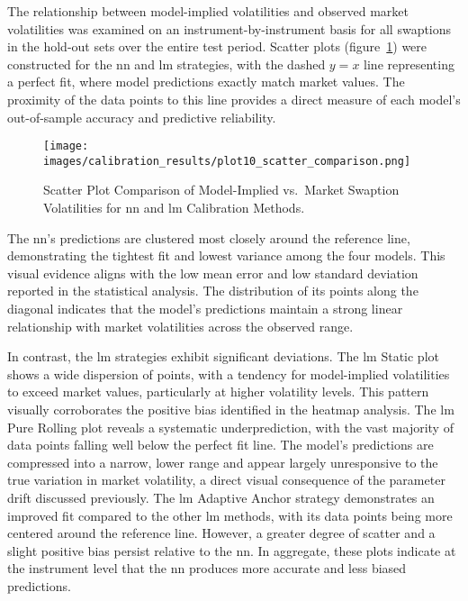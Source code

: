 The relationship between model-implied volatilities and observed market volatilities was examined on an instrument-by-instrument basis for all swaptions in the hold-out sets over the entire test period. Scatter plots (figure~\ref{fig:scatter_comparison}) were constructed for the \ac{nn} and \ac{lm} strategies, with the dashed \(y=x\) line representing a perfect fit, where model predictions exactly match market values. The proximity of the data points to this line provides a direct measure of each model's out-of-sample accuracy and predictive reliability.

\begin{figure}[H]
	\centering
	\texttt{[image: images/calibration\_results/plot10\_scatter\_comparison.png]}
	\caption{Scatter Plot Comparison of Model-Implied vs.\ Market Swaption Volatilities for \ac{nn} and \ac{lm} Calibration Methods.}
	\label{fig:scatter_comparison}
\end{figure}

The \ac{nn}'s predictions are clustered most closely around the reference line, demonstrating the tightest fit and lowest variance among the four models. This visual evidence aligns with the low mean error and low standard deviation reported in the statistical analysis. The distribution of its points along the diagonal indicates that the model's predictions maintain a strong linear relationship with market volatilities across the observed range.

In contrast, the \ac{lm} strategies exhibit significant deviations. The \ac{lm} Static plot shows a wide dispersion of points, with a tendency for model-implied volatilities to exceed market values, particularly at higher volatility levels. This pattern visually corroborates the positive bias identified in the heatmap analysis. The \ac{lm} Pure Rolling plot reveals a systematic underprediction, with the vast majority of data points falling well below the perfect fit line. The model's predictions are compressed into a narrow, lower range and appear largely unresponsive to the true variation in market volatility, a direct visual consequence of the parameter drift discussed previously. The \ac{lm} Adaptive Anchor strategy demonstrates an improved fit compared to the other \ac{lm} methods, with its data points being more centered around the reference line. However, a greater degree of scatter and a slight positive bias persist relative to the \ac{nn}. In aggregate, these plots indicate at the instrument level that the \ac{nn} produces more accurate and less biased predictions.

